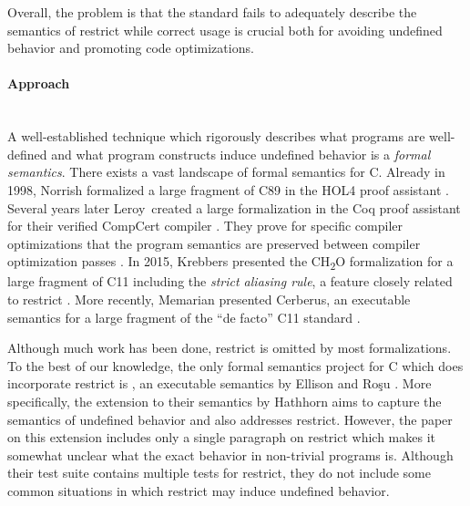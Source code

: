 Overall, the problem is that the standard fails to adequately describe the semantics of restrict while correct usage is crucial both
for avoiding undefined behavior and promoting code optimizations.

\paragraph{Approach} \leavevmode\\
A well-established technique which rigorously describes what programs are well-defined and what program constructs induce undefined behavior
is a \textit{formal semantics}.
There exists a vast landscape of formal semantics for C.
Already in 1998, Norrish formalized a large fragment of C89 in the HOL4 proof assistant \cite{norrish1998c}.
Several years later Leroy~\etall created a large formalization in the Coq proof assistant for their verified CompCert compiler \cite{leroy2006formal}.
They prove for specific compiler optimizations that the program semantics are preserved between compiler optimization passes \cite{leroy2009formal, leroy2016compcert}.
In 2015, Krebbers presented the CH\textsubscript{2}O formalization for a large fragment of C11 including the \textit{strict aliasing rule}, a feature closely related to restrict \cite{krebbers2015c}.
More recently, Memarian presented Cerberus, an executable semantics for a large fragment of the ``de facto'' C11 standard \cite{memarian2023cerberus}.

Although much work has been done, restrict is omitted by most formalizations.
To the best of our knowledge, the only formal semantics project for C which does incorporate restrict is \cink{}, an executable semantics by Ellison and Ro{\c{s}}u \cite{ellison2012executable}.  
More specifically, the extension to their semantics by Hathhorn \etall \cite{hathhorn2015defining} aims to capture the semantics of undefined behavior and also addresses restrict.
However, the paper on this extension includes only a single paragraph on restrict which makes it somewhat unclear what the exact behavior in non-trivial programs is.
Although their test suite contains multiple tests for restrict, they do not include some common situations in which restrict may
induce undefined behavior.

